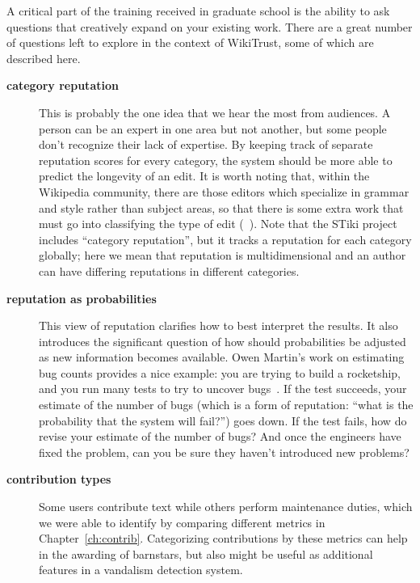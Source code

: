 A critical part of the training received in graduate school
is the ability to ask questions that creatively expand on your
existing work.
There are a great number of questions left to explore in the
context of WikiTrust, some of which are described here.

\begin{description}
\item[\textbf{category reputation}]
    This is probably the one idea that we hear the most from audiences.
    A person can be
    an expert in one area but not another, but some people don't
    recognize their lack of expertise.
    By keeping track of separate reputation scores for every category,
    the system should be more able to predict the longevity of an edit.
    It is worth noting that, within the Wikipedia community, there
    are those editors which specialize in grammar and style rather than
    subject areas, so that there is some extra work that must go
    into classifying the type of edit (\eg~\cite{Fong2010}).
    Note that the STiki project~\cite{West2010} includes ``category
    reputation'', but it tracks a reputation for each category globally;
    here we mean that reputation is multidimensional and an author can
    have differing reputations in different categories.

\item[\textbf{reputation as probabilities}]  This view of reputation
    clarifies how to best interpret the results.
    It also introduces the significant question of how should probabilities
    be adjusted as new information becomes available.
    Owen Martin's work on estimating bug counts provides a nice example:
    you are trying to build a rocketship, and you run many
    tests to try to uncover bugs~\cite{Martin2011}.
    If the test succeeds, your estimate
    of the number of bugs (which is a form of reputation: ``what is
    the probability that the system will fail?'') goes down.
    If the test fails, how do revise your estimate of the number
    of bugs?  And once the engineers have fixed the problem, can
    you be sure they haven't introduced new problems?

\item[\textbf{contribution types}]
    Some users contribute text while others perform maintenance duties,
    which we were able to identify by comparing different metrics in
    Chapter~\ref{ch:contrib}.
    Categorizing contributions by these metrics can help in the awarding
    of barnstars, but also might be useful as additional features in a
    vandalism detection system.


\end{description}
